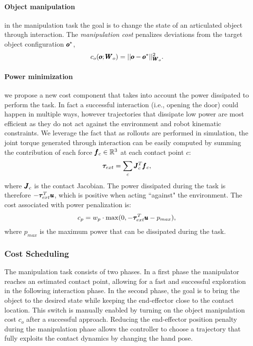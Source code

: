  \paragraph{Object manipulation} in the manipulation task the goal is to change the state of an articulated object through interaction. The \textit{manipulation cost} penalizes deviations from the target object configuration $\pmb{o}^{*}$,
\begin{equation}
    c_o(\pmb{o}; \pmb{W}_{o}) = || \pmb{o} - \pmb{o}^{*}||^2_{\pmb{W}_{o}}.
\end{equation}
\paragraph{Power minimization} we propose a new cost component that takes into account the power dissipated to perform the task. In fact a successful interaction (i.e., opening the door) could happen in multiple ways, however trajectories that dissipate low power are most efficient as they do not act against the environment and robot kinematic constraints. We leverage the fact that as rollouts are performed in simulation, the joint torque generated through interaction can be easily computed by summing the contribution of each force $\pmb{f}_c \in \mathbb{R}^{3}$ at each contact point $c$:
\begin{equation}
\boldsymbol{\tau}_{ext} = \sum\limits_{c} \pmb{J}_c^T \pmb{f}_c,    
\end{equation}
where $\pmb{J}_c$ is the contact Jacobian. The power dissipated during the task is therefore $-\boldsymbol{\tau}_{ext}^T\pmb{u}$, which is positive when acting ``against" the environment. The cost associated with power penalization is:
\begin{equation}
   c_p = w_{p} \cdot \max(0, - \boldsymbol{\tau}_{ext}^T\pmb{u} - p_{max}),      
 \end{equation}
where $p_{max}$ is the maximum power that can be dissipated during the task.

\subsubsection{Cost Scheduling}
The manipulation task consists of two phases. In a first phase the manipulator reaches an estimated contact point, allowing for a fast and successful exploration in the following interaction phase. In the second phase, the goal is to bring the object to the desired state while keeping the end-effector close to the contact location. This switch is manually enabled by turning on the object manipulation cost $c_o$ after a successful approach. Reducing the end-effector position penalty during the manipulation phase allows the controller to choose a trajectory that fully exploits the contact dynamics by changing the hand pose.

